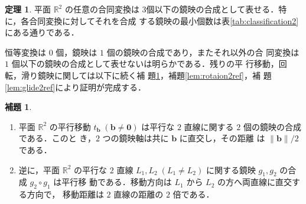 \documentclass[11pt, uplatex, dvipdfmx, titlepage]{jsarticle}
\makeatletter
\DeclareMathOperator{\Fix}{Fix}
\renewenvironment{proof}[1][\proofname]{\par
  \pushQED{\qed}%
  \normalfont \topsep6\p@\@plus6\p@\relax
  \trivlist
  \item[\hskip\labelsep
         \bfseries
    {#1}]\ignorespaces
}{%
  \popQED\endtrivlist\@endpefalse
}
\theoremstyle{definition}
\newtheorem{theorem}{定理}[section]
\newtheorem{lemma}{補題}[section]
\renewcommand{\proofname}{\textbf{証明}}
\makeatother
\begin{document}





\begin{theorem}\label{thm:generate2}
  平面 $\mathbb{R}^2$ の任意の合同変換は
  $3$個以下の鏡映の合成として表せる．特に，各合同変換に対してそれを合成
  する鏡映の最小個数は表\ref{tab:classification2}にある通りである．
\end{theorem}
\begin{proof}
  恒等変換は $0$ 個，鏡映は $1$ 個の鏡映の合成であり，またそれ以外の合
  同変換は $1$ 個以下の鏡映の合成として表せないは明らかである．残りの平
  行移動，回転，滑り鏡映に関しては以下に続く補
  題\ref{lem:translation2ref}，補題\ref{lem:rotaion2ref}，補
  題\ref{lem:glide2ref}により証明が完成する．
\end{proof}

  
\begin{lemma}\label{lem:translation2ref}
  \begin{enumerate}[(1)]
  \item 平面 $\mathbb{R}^2$ の平行移動 $t_{\bm{b}} \; (\bm{b} \neq
    \bm{0})$ は平行な $2$ 直線に関する $2$ 個の鏡映の合成である．このと
    き，$2$ つの鏡映軸は共に $\bm{b}$ に直交し，その距離
    は $\|\bm{b}\|/2$ である．
    
  \item 逆に，平面 $\mathbb{R}^2$ の平行な $2$ 直線 $L_1, L_2 \;(L_1
    \neq L_2)$ に関する鏡映 $g_1, g_2$ の合成 $g_2 \circ g_1$ は平行移
    動である．移動方向は $L_1$ から $L_2$ の方へ両直線に直交する方向で，
    移動距離は $2$ 直線の距離の $2$ 倍である．
  \end{enumerate}
  
\end{lemma}
\end{document}
